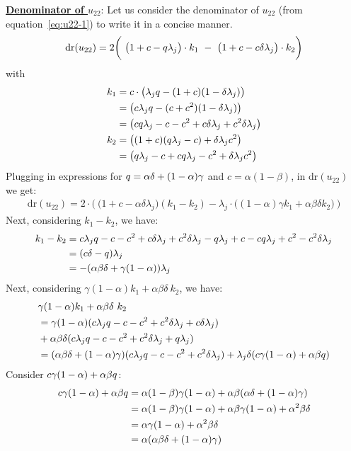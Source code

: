 \underline{\bf Denominator of $u_{22}$}:
Let us consider the denominator of $u_{22}$ (from equation~\ref{eq:u22-1}) to write it in a concise manner.
\begin{align*}
\text{dr}(u_{22})=2 \bigg(\ \big(1+c-\g \lambda_j\big)\cdot k_1\ -\ \big(1+c-c\delta\lambda_j\big)\cdot k_2 \bigg)
\end{align*}
with 
\begin{align*}
k_1&=c\cdot\big(\lambda_j q -(1+c)(1-\delta\lambda_j)\big)\\
&=\big(c\lambda_j q -(c+c^2)(1-\delta\lambda_j)\big)\\
&=\big(cq \lambda_j-c-c^2+c\delta\lambda_j+c^2\delta\lambda_j\big)\\
k_2&=\big((1+c)(q \lambda_j-c)+\delta\lambda_jc^2\big)\\
&=\big(q \lambda_j-c+cq \lambda_j-c^2+\delta\lambda_jc^2\big)
\end{align*}
Plugging in expressions for $q =\alpha\delta+(1-\alpha)\gamma$ and $c=\alpha(1-\beta)$, in $\text{dr}(u_{22})$ we get:
\begin{align}
\label{eq:dr-u22-int1}
\text{dr}(u_{22})=2\cdot\bigg(\ \big(1+c-\alpha\delta\lambda_j\big)(k_1-k_2)-\lambda_j\cdot\big((1-\alpha)\gamma k_1 + \alpha\beta\delta k_2\big)\ \bigg)
\end{align}
Next, considering $k_1-k_2$, we have:
\begin{align}
\label{eq:dr-u22-p1}
k_1-k_2&=c\lambda_j q -c-c^2+c\delta\lambda_j+c^2\delta\lambda_j-q \lambda_j+c-c q \lambda_j+c^2-c^2\delta\lambda_j\nonumber\\
&=(c\delta-q )\lambda_j\nonumber\\
&=-(\alpha\beta\delta+\gamma(1-\alpha))\lambda_j
\end{align}
Next, considering $\gamma(1-\alpha)k_1+\alpha\beta\delta\ k_2$, we have:
\begin{align*}
&\gamma(1-\alpha)k_1+\alpha\beta\delta\ k_2\\
&=\gamma(1-\alpha)(c\lambda_j q -c-c^2+c^2\delta\lambda_j+c\delta\lambda_j)\\
&+\alpha\beta\delta(c\lambda_j q -c-c^2+c^2\delta\lambda_j+q \lambda_j)\\
&=(\alpha\beta\delta+(1-\alpha)\gamma)(c\lambda_j q -c-c^2+c^2\delta\lambda_j)+\lambda_j\delta(c\gamma(1-\alpha)+\alpha\beta q )
\end{align*}
Consider $c\gamma(1-\alpha)+\alpha\beta q $:
\begin{align*}
c\gamma(1-\alpha)+\alpha\beta q &=\alpha(1-\beta)\gamma(1-\alpha)+\alpha\beta(\alpha\delta+(1-\alpha)\gamma)\\
&=\alpha(1-\beta)\gamma(1-\alpha)+\alpha\beta\gamma(1-\alpha)+\alpha^2\beta\delta\\
&=\alpha\gamma(1-\alpha)+\alpha^2\beta\delta\\
&=\alpha(\alpha\beta\delta+(1-\alpha)\gamma)
\end{align*}

